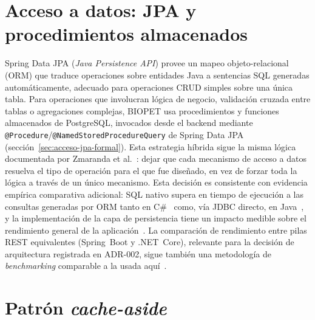 \section{Acceso a datos: JPA y procedimientos almacenados}

Spring Data JPA (\emph{Java Persistence API}) provee un mapeo
objeto-relacional (ORM) que traduce operaciones sobre entidades Java a
sentencias SQL generadas autom\'aticamente, adecuado para operaciones CRUD
simples sobre una \'unica tabla. Para operaciones que involucran l\'ogica
de negocio, validaci\'on cruzada entre tablas o agregaciones complejas,
BIOPET usa procedimientos y funciones almacenados de PostgreSQL, invocados
desde el backend mediante \texttt{@Procedure}/\texttt{@NamedStoredProcedureQuery}
de Spring Data JPA (secci\'on~\ref{sec:acceso-jpa-formal}). Esta
estrategia h\'ibrida sigue la misma l\'ogica documentada por Zmaranda et
al.~\cite{zmaranda2020crud}: dejar que cada mecanismo de acceso a datos
resuelva el tipo de operaci\'on para el que fue dise\~nado, en vez de
forzar toda la l\'ogica a trav\'es de un \'unico mecanismo. Esta decisi\'on
es consistente con evidencia emp\'irica comparativa adicional: SQL nativo
supera en tiempo de ejecuci\'on a las consultas generadas por ORM tanto en
C\#~\cite{nowicki2022comparative} como, v\'ia JDBC directo, en
Java~\cite{zuchnik2021comparative}, y la implementaci\'on de la capa de
persistencia tiene un impacto medible sobre el rendimiento general de la
aplicaci\'on~\cite{siebyla2020impact}. La comparaci\'on de rendimiento
entre pilas REST equivalentes (Spring~Boot y .NET~Core), relevante para la
decisi\'on de arquitectura registrada en ADR-002, sigue tambi\'en una
metodolog\'ia de \emph{benchmarking} comparable a la usada
aqu\'i~\cite{dhalla2021performance,godinho2024performance}.

\section{Patr\'on \emph{cache-aside}}

